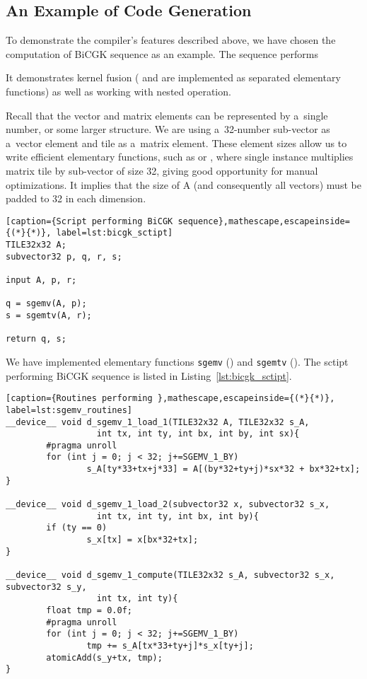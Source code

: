 \documentclass[final]{siamltex}
\begin{document}
{\subsection{An Example of Code Generation}

To demonstrate the compiler's features described above, we have chosen the computation of BiCGK sequence as an example. The sequence performs



It demonstrates kernel fusion ( and  are implemented as separated elementary functions) as well as working with nested operation.

Recall that the vector and matrix elements can be represented by a~single number, or some larger structure. We are using a~32-number sub-vector as a~vector element and  tile as a~matrix element. These element sizes allow us to write efficient elementary functions, such as  or , where single instance multiplies  matrix tile by sub-vector of size 32, giving good opportunity for manual optimizations. It implies that the size of A (and consequently all vectors) must be padded to 32 in each dimension.

\begin{lstlisting}[caption={Script performing BiCGK sequence},mathescape,escapeinside={(*}{*)}, label=lst:bicgk_sctipt]
TILE32x32 A;
subvector32 p, q, r, s;

input A, p, r;

q = sgemv(A, p);
s = sgemtv(A, r);

return q, s;
\end{lstlisting}

We have implemented elementary functions \texttt{sgemv} () and \texttt{sgemtv} (). The sctipt performing BiCGK sequence is listed in Listing~\ref{lst:bicgk_sctipt}.

\begin{lstlisting}[caption={Routines performing },mathescape,escapeinside={(*}{*)}, label=lst:sgemv_routines]
__device__ void d_sgemv_1_load_1(TILE32x32 A, TILE32x32 s_A, 
                  int tx, int ty, int bx, int by, int sx){
        #pragma unroll
        for (int j = 0; j < 32; j+=SGEMV_1_BY)
                s_A[ty*33+tx+j*33] = A[(by*32+ty+j)*sx*32 + bx*32+tx];
}

__device__ void d_sgemv_1_load_2(subvector32 x, subvector32 s_x, 
                  int tx, int ty, int bx, int by){
        if (ty == 0)
                s_x[tx] = x[bx*32+tx];
}

__device__ void d_sgemv_1_compute(TILE32x32 s_A, subvector32 s_x, subvector32 s_y, 
                  int tx, int ty){
        float tmp = 0.0f;
        #pragma unroll
        for (int j = 0; j < 32; j+=SGEMV_1_BY)
                tmp += s_A[tx*33+ty+j]*s_x[ty+j];
        atomicAdd(s_y+tx, tmp);
}


\end{lstlisting}}
\end{document}
